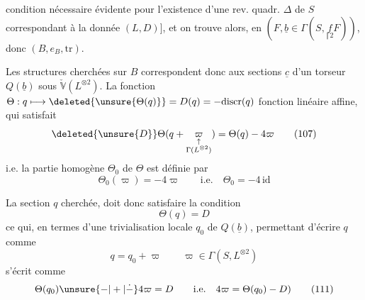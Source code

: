 condition nécessaire évidente pour l'existence d'une rev. quadr. $\Delta$ de $S$ correspondant à la donnée $(L,D)$], et on trouve alors, en    $(F,\underline b\in\Gamma(S,\underset{\scriptscriptstyle\Vert\,2}{f}F))$, donc $(B,e_B,\mathrm{tr})$.

Les structures  cherchées  sur $B$ correspondent donc aux sections $\underline c$ d'un  torseur $Q(\underline b)$ sous $\check{\mathbb V}(L^{\otimes2})$.  La fonction \deleted{$\unsure{\Theta(}$} $\Theta:q\longmapsto\deleted{\unsure{\Theta(q)}}=D(q)=-\mathrm{discr}(q)$    fonction linéaire affine, qui satisfait
\[\deleted{\unsure{D}}\Theta(q+\underset{\substack{\uparrow\\\Gamma(L^{\otimes2})}}{\varpi})=\Theta(q)-4\varpi\tag*{(107)}\]
i.e. la partie homogène $\Theta_0$ de $\Theta$ est définie par
\[\Theta_0(\varpi)=-4\varpi\qquad\text{i.e.}\quad\Theta_0=-4\,\mathrm{id}\tag*{(108)}\]

La section $q$ cherchée, doit donc satisfaire la condition
\[\Theta(q)=D\tag*{(109)}\]
ce qui, en termes d'une trivialisation locale $q_0$ de $Q(\underline b)$, permettant d'écrire $q$ comme
\[q=q_0+\varpi\qquad\varpi\in\Gamma(S,L^{\otimes2})\tag*{(110)}\]
s'écrit comme
\[\Theta(q_0)\unsure{-|+|\dot{-}}4\varpi=D\qquad\text{i.e.}\quad4\varpi=\Theta(q_0)-D)\tag*{(111)}\]
